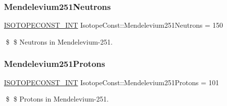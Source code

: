 \subsubsection{\texorpdfstring{Mendelevium251\+Neutrons}{Mendelevium251Neutrons}}
{\footnotesize\ttfamily \mbox{\hyperlink{group___isotope_const-_macros_ga5f18360b3e99483a35c32d789e62621c}{I\+S\+O\+T\+O\+P\+E\+C\+O\+N\+S\+T\+\_\+\+I\+NT}} Isotope\+Const\+::\+Mendelevium251\+Neutrons = 150}

\$ \$ Neutrons in Mendelevium-\/251. \mbox{\label{group___isotope_const-_mendelevium-_md251_ga42d6f624a84aedb747a0732703a7e6b4}} 
\subsubsection{\texorpdfstring{Mendelevium251\+Protons}{Mendelevium251Protons}}
{\footnotesize\ttfamily \mbox{\hyperlink{group___isotope_const-_macros_ga5f18360b3e99483a35c32d789e62621c}{I\+S\+O\+T\+O\+P\+E\+C\+O\+N\+S\+T\+\_\+\+I\+NT}} Isotope\+Const\+::\+Mendelevium251\+Protons = 101}

\$ \$ Protons in Mendelevium-\/251. 